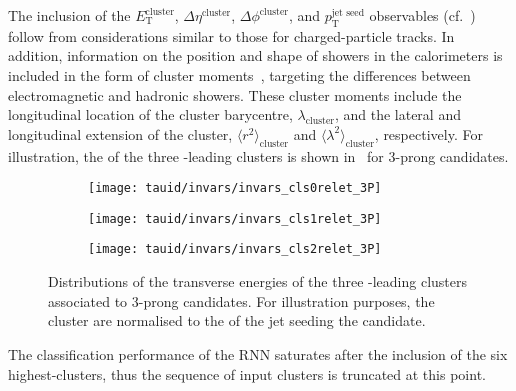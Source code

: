 The inclusion of the $E_{\text{T}}^{\text{cluster}}$,
$\Delta \eta^{\text{cluster}}$, $\Delta \phi^{\text{cluster}}$, and
$p_{\text{T}}^{\text{jet seed}}$ observables
(cf.~) follow from considerations
similar to those for charged-particle tracks. In addition, information
on the position and shape of showers in the calorimeters is included
in the form of cluster moments~\cite{PERF-2014-07}, targeting the
differences between electromagnetic and hadronic showers. These
cluster moments include the longitudinal location of the cluster
barycentre, $\lambda_{\text{cluster}}$, and the lateral and
longitudinal extension of the cluster,
$\langle r^2 \rangle_{\text{cluster}}$ and
$\langle \lambda^2 \rangle_{\text{cluster}}$, respectively. For
illustration, the \ET of the three \ET-leading clusters is shown
in~ for 3-prong \tauhadvis
candidates.

\begin{figure}[htbp]
  \centering

  \begin{subfigure}{0.33\textwidth}
    \texttt{[image: tauid/invars/invars\_cls0relet\_3P]}
    \subcaption{}%
    \label{fig:tauid_low_level_variables_cluster0}
  \end{subfigure}%
  \begin{subfigure}{0.33\textwidth}
    \texttt{[image: tauid/invars/invars\_cls1relet\_3P]}
    \subcaption{}%
    \label{fig:tauid_low_level_variables_cluster1}
  \end{subfigure}%
  \begin{subfigure}{0.33\textwidth}
    \texttt{[image: tauid/invars/invars\_cls2relet\_3P]}
    \subcaption{}%
    \label{fig:tauid_low_level_variables_cluster2}
  \end{subfigure}

  \caption[Distributions of the transverse energy of the three \ET-leading
  clusters associated to 3-prong \tauhadvis candidates.]{Distributions of the
    transverse energies of the three \ET-leading clusters associated to 3-prong
    \tauhadvis candidates. For illustration purposes, the cluster \ET are
    normalised to the \pT of the jet seeding the \tauhadvis candidate.}%
  \label{fig:tauid_low_level_variables_cluster}
\end{figure}

The classification performance of the RNN \tauid saturates after the inclusion
of the six highest-\ET clusters, thus the sequence of input clusters is
truncated at this point.


